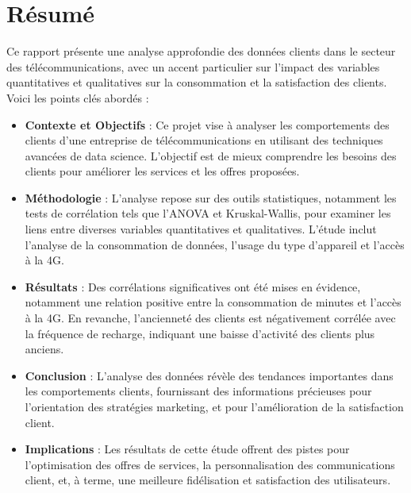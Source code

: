 \chapter*{Résumé}

\adjustmtc
\thispagestyle{MyStyle}

\justifying

\sloppy {} 

Ce rapport présente une analyse approfondie des données clients dans le secteur des télécommunications, avec un accent particulier sur l'impact des variables quantitatives et qualitatives sur la consommation et la satisfaction des clients. Voici les points clés abordés :

\begin{itemize}
    \item \textbf{Contexte et Objectifs} : Ce projet vise à analyser les comportements des clients d'une entreprise de télécommunications en utilisant des techniques avancées de data science. L'objectif est de mieux comprendre les besoins des clients pour améliorer les services et les offres proposées.
    
    \item \textbf{Méthodologie} : L'analyse repose sur des outils statistiques, notamment les tests de corrélation tels que l'ANOVA et Kruskal-Wallis, pour examiner les liens entre diverses variables quantitatives et qualitatives. L'étude inclut l'analyse de la consommation de données, l'usage du type d'appareil et l'accès à la 4G.
    
    \item \textbf{Résultats} : Des corrélations significatives ont été mises en évidence, notamment une relation positive entre la consommation de minutes et l'accès à la 4G. En revanche, l'ancienneté des clients est négativement corrélée avec la fréquence de recharge, indiquant une baisse d'activité des clients plus anciens.
    
    \item \textbf{Conclusion} : L'analyse des données révèle des tendances importantes dans les comportements clients, fournissant des informations précieuses pour l’orientation des stratégies marketing, et pour l'amélioration de la satisfaction client.
    
    \item \textbf{Implications} : Les résultats de cette étude offrent des pistes pour l’optimisation des offres de services, la personnalisation des communications client, et, à terme, une meilleure fidélisation et satisfaction des utilisateurs.
\end{itemize}


